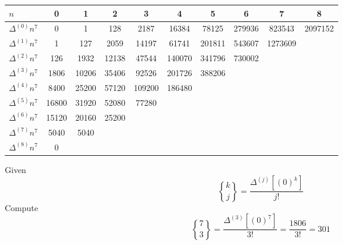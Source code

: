 \documentclass[10pt, AMS Euler]{article}
\newcommand{\stirling}[2]{\genfrac{\{}{\}}{0pt}{}{#1}{#2}}
\begin{document}
		      \begin{center}
                \begin{tabular}{l|ccccccccc}
                    {\bf $n$ } & 0 & 1 & 2 & 3 & 4 & 5 & 6 & 7 & 8\\
                    \hline
                    {$\Delta^{(0)} n^7$} & 0 & 1 & 128 & 2187 & 16384 & 78125 & 279936 & 823543 & 2097152 \\
                    {$\Delta^{(1)} n^7$} & 1 & 127 & 2059 & 14197 & 61741 & 201811 & 543607 &  1273609  \\
                    {$\Delta^{(2)}n^7$} & 126 & 1932 & 12138 & 47544 & 140070 & 341796 &  730002 \\
                    {$\Delta^{(3)}n^7$} & 1806 & 10206 & 35406 & 92526 & 201726 &  388206  \\
                    {$\Delta^{(4)}n^7$} & 8400 & 25200 & 57120 & 109200 &   186480  \\
                    {$\Delta^{(5)}n^7$} & 16800 & 31920 & 52080 &  77280   \\
                    {$\Delta^{(6)}n^7$} & 15120 & 20160 & 25200  \\
                    {$\Delta^{(7)}n^7$} & 5040 & 5040   \\
                    {$\Delta^{(8)}n^7$} & 0 &   \\
                \end{tabular}
            \end{center}
            Given
            $$\stirling{k}{j} = \frac{\Delta^{(j)}[(0)^k]}{j!}$$
            Compute
            $$\stirling{7}{3} = \frac{\Delta^{(3)}[(0)^7]}{3!}=\frac{1806}{3!}=301$$
            
	
	
	\noindent \underline{\hspace{3in}}\\
	
	
	
	
\end{document}
